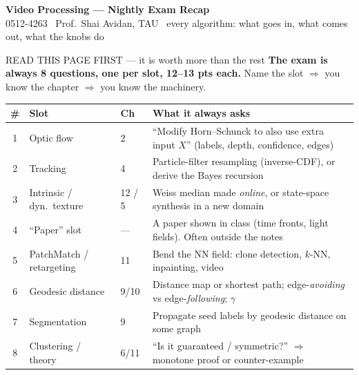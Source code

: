 \documentclass[9pt,a4paper]{extarticle}
\begin{document}
\pagestyle{plain}

\begin{center}
{\LARGE\bfseries Video Processing --- Nightly Exam Recap}\\[2pt]
{\small 0512-4263 \textbullet\ Prof.\ Shai Avidan, TAU \textbullet\ every algorithm: what goes in, what comes out, what the knobs do}
\end{center}
\vspace{-4pt}

\begin{keybox}{READ THIS PAGE FIRST --- it is worth more than the rest}
\textbf{The exam is always 8 questions, one per slot, 12--13 pts each.} Name the slot $\Rightarrow$ you know the chapter $\Rightarrow$ you know the machinery.

\smallskip
\begin{center}\footnotesize
\begin{tabular}{@{}clll@{}}
\textbf{\#} & \textbf{Slot} & \textbf{Ch} & \textbf{What it always asks}\\ \midrule
1 & Optic flow & 2 & ``Modify Horn--Schunck to also use extra input $X$'' (labels, depth, confidence, edges)\\
2 & Tracking & 4 & Particle-filter resampling (inverse-CDF), or derive the Bayes recursion\\
3 & Intrinsic / dyn.\ texture & 12 / 5 & Weiss median made \emph{online}, or state-space synthesis in a new domain\\
4 & ``Paper'' slot & --- & A paper shown in class (time fronts, light fields). Often outside the notes\\
5 & PatchMatch / retargeting & 11 & Bend the NN field: clone detection, $k$-NN, inpainting, video\\
6 & Geodesic distance & 9/10 & Distance map or shortest path; edge-\emph{avoiding} vs edge-\emph{following}; $\gamma$\\
7 & Segmentation & 9 & Propagate seed labels by geodesic distance on some graph\\
8 & Clustering / theory & 6/11 & ``Is it guaranteed / symmetric?'' $\Rightarrow$ monotone proof or counter-example\\
\end{tabular}
\end{center}


\end{keybox}
\end{document}
